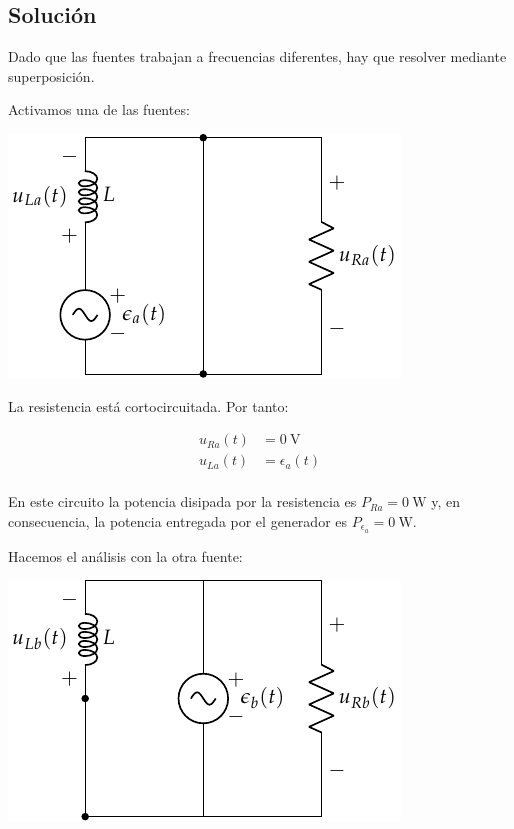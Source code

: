 \subsection*{Solución}

Dado que las fuentes trabajan a frecuencias diferentes, hay que resolver mediante superposición.

Activamos una de las fuentes:
\begin{center}
\includegraphics{figuras/superposicion2_A}
\end{center}

La resistencia está cortocircuitada. Por tanto:

\begin{align*}
  u_{Ra}(t) &= \qty{0}{\volt}\\
  u_{La}(t) &= \epsilon_a(t)\\  
\end{align*}

En este circuito la potencia disipada por la resistencia es $P_{Ra} = \qty{0}{\watt}$ y, en consecuencia, la potencia entregada por el generador es $P_{\epsilon_a} = \qty{0}{\watt}$.

Hacemos el análisis con la otra fuente:

\begin{center}
\includegraphics{figuras/superposicion2_B}
\end{center}

